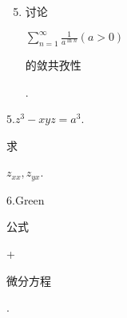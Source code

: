 \documentclass[10pt]{article}
\begin{document}
\begin{enumerate}
  \setcounter{enumi}{4}
  \item \begin{CJK}{UTF8}{mj}讨论\end{CJK} $\sum_{n=1}^{\infty} \frac{1}{a^{\ln n}}(a>0)$ \begin{CJK}{UTF8}{mj}的敛共孜性\end{CJK}.
\end{enumerate}
$5 . z^{3}-x y z=a^{3}$. \begin{CJK}{UTF8}{mj}求\end{CJK} $z_{x x}, z_{y x}$.

6.Green\begin{CJK}{UTF8}{mj}公式\end{CJK} + \begin{CJK}{UTF8}{mj}微分方程\end{CJK}.
\end{document}
